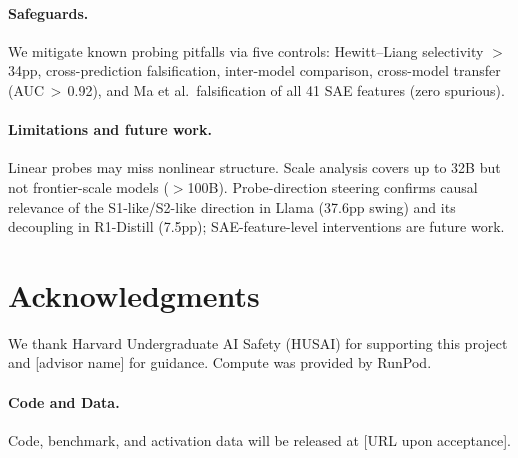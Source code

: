\documentclass[accepted]{article}
\newcommand{\sone}{S1-like}
\newcommand{\stwo}{S2-like}
\begin{document}
\paragraph{Safeguards.}
We mitigate known probing pitfalls \citep{meloux2025dead,
sanitychecks2026} via five controls: Hewitt--Liang selectivity $>$34pp,
cross-prediction falsification, inter-model comparison, cross-model
transfer (AUC\,$>$\,0.92), and Ma et al.\ falsification of all 41 SAE
features (zero spurious).

\paragraph{Limitations and future work.}
Linear probes may miss nonlinear structure.  Scale analysis covers up to 32B but not frontier-scale models ($>$100B).  Probe-direction steering confirms causal relevance of the \sone{}/\stwo{} direction in Llama (37.6pp swing) and its decoupling in R1-Distill (7.5pp); SAE-feature-level interventions are future work.


\section*{Acknowledgments}

We thank Harvard Undergraduate AI Safety (HUSAI) for supporting this
project and [advisor name] for guidance.  Compute was provided by
RunPod.

\paragraph{Code and Data.}
Code, benchmark, and activation data will be released at [URL upon
acceptance].




\end{document}
